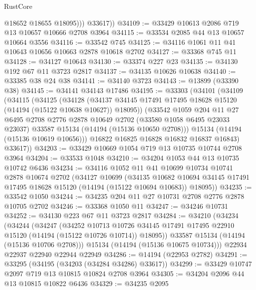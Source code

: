 \begin{lexlean}{RustCore}
\begin{coremodule}
              @18652
              @18655
              @18095)))
        @33617))
@34109 := @33429 @10613 @2086 @719 @13 @10657 @10666 @2708 @3964
@34115 := @33534 @2085 @44 @13 @10657 @10664 @3556
@34116 := @33542 @745
@34125 := @34116 @1061 @11 @41 @10643 @10656 @10663 @2878 @10618 @2702
@34127 := @33368 @745 @11
@34128 := @34127 @10643
@34130 := @33374 @227 @23
@34135 := @34130 @192 @67 @11 @3723 @2817
@34137 := @34135 @10626 @10638
@34140 := @33385 @38 @24 @38
@34141 := @34140 @3723
@34143 := @13899 (@33390 @38)
@34145 := @34141 @34143 @17486
@34195 := @33303
    (@34101
      (@34109
        (@34115
          (@34125
            (@34128
              (@34137 @34145 @17491 @17495 @18628 @15120 (@14194 (@15122 @10638 @10627)) @18095))
            (@33542
              @1059
              @204
              @11
              @27
              @6495
              @2708
              @2776
              @2878
              @10649
              @2702
              (@33580 @1058 @6495 @23033 @23037)
              @33587
              @15134
              (@14194 (@15136 @10650 @2708)))
            @15134
            (@14194 (@15136 @10619 @10656)))
          @16822
          @16825
          @16828
          @16832
          @16837
          @16843)
        @33617))
@34203 := @33429 @10669 @1054 @719 @13 @10735 @10744 @2708 @3964
@34204 := @33533 @1048
@34210 := @34204 @1053 @44 @13 @10735 @10742 @6436
@34234 := @34116
    @1052
    @11
    @41
    @10699
    @10734
    @10741
    @2878
    @10674
    @2702
    (@34127
      @10699
      (@34135
        @10682
        @10694
        @34145
        @17491
        @17495
        @18628
        @15120
        (@14194 (@15122 @10694 @10683))
        @18095))
@34235 := @33542 @1050
@34244 := @34235 @204 @11 @27 @10731 @2708 @2776 @2878 @10705 @2702
@34246 := @33368 @1050 @11
@34247 := @34246 @10731
@34252 := @34130 @223 @67 @11 @3723 @2817
@34284 := @34210
    (@34234
      (@34244
        (@34247
          (@34252
            @10713
            @10726
            @34145
            @17491
            @17495
            @22910
            @15120
            (@14194 (@15122 @10726 @10714))
            @18095))
        @33587
        @15134
        (@14194 (@15136 @10706 @2708)))
      @15134
      (@14194 (@15136 @10675 @10734)))
    @22934
    @22937
    @22940
    @22944
    @22949
@34286 := @14194 (@22953 @2782)
@34291 := @33295 (@34195 (@34203 (@34284 @34286) @33617))
@34299 := @33429 @10747 @2097 @719 @13 @10815 @10824 @2708 @3964
@34305 := @34204 @2096 @44 @13 @10815 @10822 @6436
@34329 := @34235
    @2095

\end{coremodule}
\end{lexlean}

